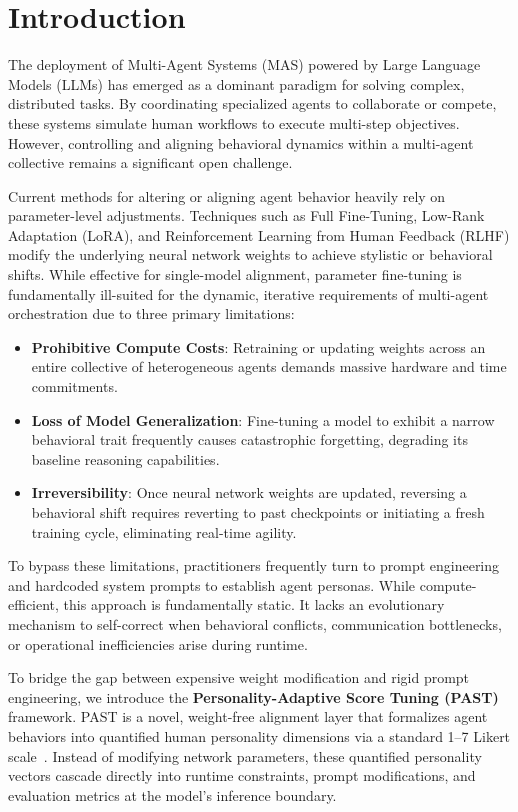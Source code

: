 \documentclass[11pt]{article}
\providecommand{\tightlist}{\setlength{\itemsep}{0pt}\setlength{\parskip}{0pt}}
\begin{document}
\section{Introduction}\label{introduction}

The deployment of Multi-Agent Systems (MAS) powered by Large Language Models (LLMs) has emerged as a dominant paradigm for solving complex, distributed tasks. By coordinating specialized agents to collaborate or compete, these systems simulate human workflows to execute multi-step objectives. However, controlling and aligning behavioral dynamics within a multi-agent collective remains a significant open challenge.

Current methods for altering or aligning agent behavior heavily rely on parameter-level adjustments. Techniques such as Full Fine-Tuning, Low-Rank Adaptation (LoRA), and Reinforcement Learning from Human Feedback (RLHF) modify the underlying neural network weights to achieve stylistic or behavioral shifts. While effective for single-model alignment, parameter fine-tuning is fundamentally ill-suited for the dynamic, iterative requirements of multi-agent orchestration due to three primary limitations:

\begin{itemize}
\tightlist
\item
  \textbf{Prohibitive Compute Costs}: Retraining or updating weights across an entire collective of heterogeneous agents demands massive hardware and time commitments.
\item
  \textbf{Loss of Model Generalization}: Fine-tuning a model to exhibit a narrow behavioral trait frequently causes catastrophic forgetting, degrading its baseline reasoning capabilities.
\item
  \textbf{Irreversibility}: Once neural network weights are updated, reversing a behavioral shift requires reverting to past checkpoints or initiating a fresh training cycle, eliminating real-time agility.
\end{itemize}

To bypass these limitations, practitioners frequently turn to prompt engineering and hardcoded system prompts to establish agent personas. While compute-efficient, this approach is fundamentally static. It lacks an evolutionary mechanism to self-correct when behavioral conflicts, communication bottlenecks, or operational inefficiencies arise during runtime.

To bridge the gap between expensive weight modification and rigid prompt engineering, we introduce the \textbf{Personality-Adaptive Score Tuning (PAST)} framework. PAST is a novel, weight-free alignment layer that formalizes agent behaviors into quantified human personality dimensions via a standard 1--7 Likert scale~\citep{grable2003}. Instead of modifying network parameters, these quantified personality vectors cascade directly into runtime constraints, prompt modifications, and evaluation metrics at the model's inference boundary.
\end{document}
